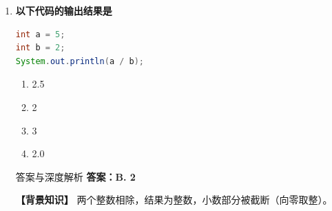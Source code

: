 \documentclass[12pt, a4paper]{ctexart} %
\newcommand{\code}[1]{\texttt{#1}}
\begin{document}
\begin{enumerate}[label=\textbf{\arabic*.}]
	      \begin{bluebox}{答案与深度解析}
		      \textbf{答案：A. int}

		      \textbf{【背景知识】}
		      Java有8种基本类型，其中 \code{int} 是最常用的32位整数类型。

		      \textbf{【考点】}
		      - 基本数据类型分类
		      - 默认类型（整数默认 \code{int}，浮点默认 \code{double}）

		      \textbf{【选项原理分析】}
		      \begin{itemize}[leftmargin=*]
			      \item \textbf{A. int} — 正确。\code{int} 是整数类型关键字。
			      \item \textbf{B. float} — 错误。单精度浮点。
			      \item \textbf{C. double} — 错误。双精度浮点。
			      \item \textbf{D. long} — 错误。虽然是整数类型，但题目问"关键字"，\code{int} 是最基础答案。
		      \end{itemize}

		      \textbf{【应背诵知识点】}
		      \begin{enumerate}
			      \item 整数类型：\code{byte} (1B), \code{short} (2B), \code{int} (4B), \code{long} (8B)
			      \item 字面量：\code{100} 是 \code{int}，\code{100L} 是 \code{long}
		      \end{enumerate}
	      \end{bluebox}

	      \vspace{1em}

	\item \textbf{以下代码的输出结果是}
	      \begin{lstlisting}[language=Java]
int a = 5;
int b = 2;
System.out.println(a / b);
\end{lstlisting}
	      \begin{enumerate}[label=\Alph*.]
		      \item 2.5
		      \item 2
		      \item 3
		      \item 2.0
	      \end{enumerate}

	      \begin{bluebox}{答案与深度解析}
		      \textbf{答案：B. 2}

		      \textbf{【背景知识】}
		      两个整数相除，结果为整数，小数部分被截断（向零取整）。


\end{bluebox}
\end{enumerate}
\end{document}
